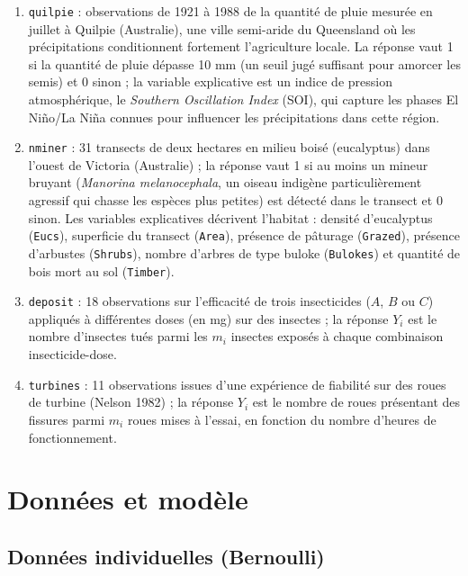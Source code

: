 \documentclass[
  french,
  letterpaper,
  DIV=11,
  numbers=noendperiod]{scrreprt}
\begin{document}
\begin{enumerate}
\def\labelenumi{\arabic{enumi}.}
\item
  \protect{}\label{data-quilpie}{\texttt{quilpie}} :
  observations de 1921 à 1988 de la quantité de pluie mesurée en juillet
  à Quilpie (Australie), une ville semi-aride du Queensland où les
  précipitations conditionnent fortement l'agriculture locale. La
  réponse vaut 1 si la quantité de pluie dépasse 10 mm (un seuil jugé
  suffisant pour amorcer les semis) et 0 sinon ; la variable explicative
  est un indice de pression atmosphérique, le \emph{Southern Oscillation
  Index} (SOI), qui capture les phases El Niño/La Niña connues pour
  influencer les précipitations dans cette région.
\item
  \protect{}\label{data-nminer}{\texttt{nminer}} : 31
  transects de deux hectares en milieu boisé (eucalyptus) dans l'ouest
  de Victoria (Australie) ; la réponse vaut 1 si au moins un mineur
  bruyant (\emph{Manorina melanocephala}, un oiseau indigène
  particulièrement agressif qui chasse les espèces plus petites) est
  détecté dans le transect et 0 sinon. Les variables explicatives
  décrivent l'habitat : densité d'eucalyptus (\texttt{Eucs}), superficie
  du transect (\texttt{Area}), présence de pâturage (\texttt{Grazed}),
  présence d'arbustes (\texttt{Shrubs}), nombre d'arbres de type buloke
  (\texttt{Bulokes}) et quantité de bois mort au sol (\texttt{Timber}).
\item
  \protect{}\label{data-deposit}{\texttt{deposit}} : 18
  observations sur l'efficacité de trois insecticides (\(A\), \(B\) ou
  \(C\)) appliqués à différentes doses (en mg) sur des insectes ; la
  réponse \(Y_i\) est le nombre d'insectes tués parmi les \(m_i\)
  insectes exposés à chaque combinaison insecticide-dose.
\item
  \protect{}\label{data-turbines}{\texttt{turbines}} : 11
  observations issues d'une expérience de fiabilité sur des roues de
  turbine (Nelson 1982) ; la réponse \(Y_i\) est le nombre de roues
  présentant des fissures parmi \(m_i\) roues mises à l'essai, en
  fonction du nombre d'heures de fonctionnement.
\end{enumerate}

\section{Données et modèle}\label{donnuxe9es-et-moduxe8le}

\subsection{Données individuelles
(Bernoulli)}\label{donnuxe9es-individuelles-bernoulli}
\end{document}
